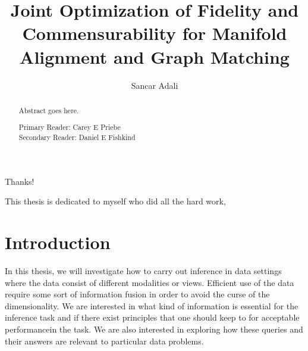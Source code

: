 \documentclass[12pt,oneside,final]{thesis}\usepackage[]{graphicx}\usepackage[]{color}
\begin{document}
\title{Joint Optimization of Fidelity and Commensurability for Manifold Alignment and Graph Matching}
\author{Sancar Adali}
\dissertation
\doctorphilosophy
\copyrightnotice





\begin{frontmatter}

\maketitle

\begin{abstract}

Abstract goes here.

\vspace{1cm}

\noindent Primary Reader: Carey E Priebe\\
Secondary Reader: Daniel E Fishkind

\end{abstract}

\begin{acknowledgment}

Thanks!

\end{acknowledgment}

\begin{dedication}
 
This thesis is dedicated to myself who did all the hard work,

\end{dedication}

\tableofcontents

\listoftables

\listoffigures

\end{frontmatter}




\chapter{Introduction}
\label{sec:intro}


In this thesis, we will investigate how to carry out inference in  data  settings where the data consist of different modalities or views. Efficient use of the data require some sort of information fusion in order to avoid the curse of the dimensionality. We are interested in what kind of information is essential for the inference task and if there exist principles that one should keep to for acceptable performancein the task. We are also interested in exploring how these  queries and their answers are  relevant to  particular data problems.
\end{document}

